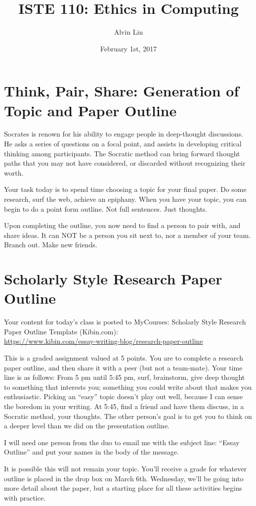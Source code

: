 \documentclass[letterpaper, 12pt]{article}
\title{ISTE 110: Ethics in Computing}
\author{Alvin Lin}
\date{February 1st, 2017}
\begin{document}
\maketitle

\section*{Think, Pair, Share: Generation of Topic and Paper Outline}
Socrates is renown for his ability to engage people in deep-thought
discussions. He asks a series of questions on a focal point, and assists in
developing critical thinking among participants. The Socratic method can bring
forward thought paths that you may not have considered, or discarded without
recognizing their worth. \par
Your task today is to spend time choosing a topic for your final paper. Do some
research, surf the web, achieve an epiphany. When you have your topic, you can
begin to do a point form outline. Not full sentences. Just thoughts. \par
Upon completing the outline, you now need to find a person to pair with, and
share ideas. It can NOT be a person you sit next to, nor a member of your
team. Branch out. Make new friends. \par

\section*{Scholarly Style Research Paper Outline}
Your content for today's class is posted to MyCourses:
Scholarly Style Research Paper Outline Template (Kibin.com): \\
\url{https://www.kibin.com/essay-writing-blog/research-paper-outline} \par
This is a graded assignment valued at 5 points. You are to complete a research
paper outline, and then share it with a peer (but not a team-mate).
Your time line is as follows: From 5 pm until 5:45 pm, surf, brainstorm, give
deep thought to something that interests you; something you could write about
that makes you enthusiastic. Picking an ``easy'' topic doesn't play out well,
because I can sense the boredom in your writing. At 5:45, find a friend and
have them discuss, in a Socratic method, your thoughts. The other person's goal
is to get you to think on a deeper level than we did on the presentation
outline. \par
I will need one person from the duo to email me with the subject line: ``Essay
Outline'' and put your names in the body of the message. \par
It is possible this will not remain your topic. You'll receive a grade for
whatever outline is placed in the drop box on March 6th. Wednesday, we'll be
going into more detail about the paper, but a starting place for all these
activities begins with practice.
\end{document}
